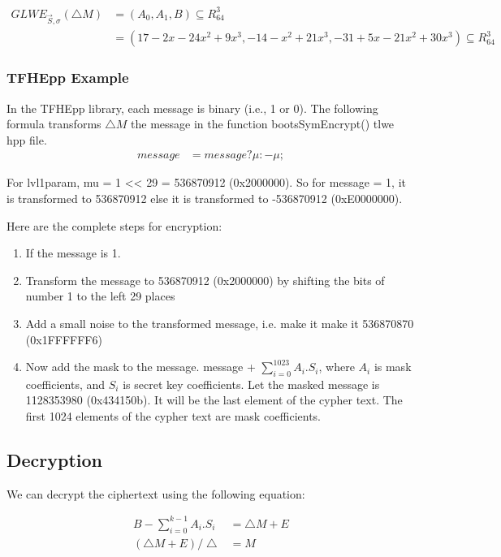 \documentclass{techrep}
\theoremstyle{definition}
\theoremstyle{plain}
\begin{document}
	\begin{align*}
        GLWE_{\overrightarrow{S},\sigma}(\bigtriangleup M)	&=	 (A_0,A_{1}, B) \subseteq  R_{64}^{3} \\
        &= (17-2x -24x^2 +9x^3, -14-x^2+21x^3, -31 + 5x - 21x^2 + 30x^3) \subseteq  R_{64}^{3} 
	\end{align*}

\subsubsection{TFHEpp Example}
In the TFHEpp library, each message is binary (i.e., 1 or 0). The following formula transforms $\bigtriangleup M$ the message in the function bootsSymEncrypt() tlwe hpp file. 
	\begin{align*}
		message &= message ? \mu : -\mu;
	\end{align*}

For lvl1param, mu = 1 << 29 = 536870912 (0x2000000). So for message = 1, it is transformed to 536870912 else it is transformed to -536870912 (0xE0000000). 

Here are the complete steps for encryption:
\begin{enumerate}
  \item If the message is 1.
  \item Transform the message to 536870912 (0x2000000) by shifting the bits of number 1 to the left 29 places
  \item Add a small noise to the transformed message, i.e. make it make it 536870870 (0x1FFFFFF6)
  \item Now add the mask to the message.  message + $\sum_{i=0}^{1023}A_i . S_i$, where $A_i$ is mask coefficients, and $S_i$ is secret key coefficients.  Let the masked message is 1128353980 (0x434150b). It will be the last element of the cypher text. The first 1024 elements of the cypher text are mask coefficients.
\end{enumerate}

	\subsection{Decryption}
We can decrypt the ciphertext using the following equation:

	\begin{align*}
		B  - \sum_{i=0}^{k-1}A_i . S_i  &= \bigtriangleup M + E   \\
             (\bigtriangleup M + E)/\bigtriangleup  &= M \\
	\end{align*}
\end{document}
